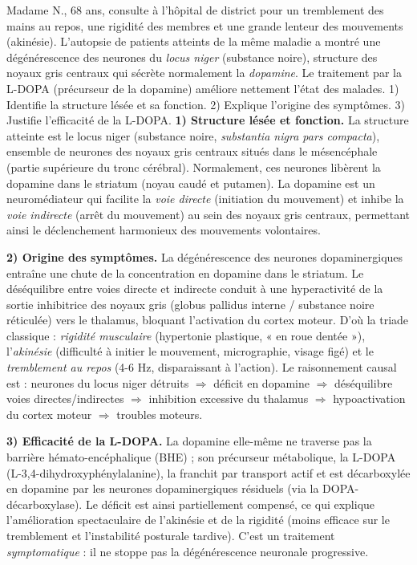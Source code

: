 \documentclass[11pt]{article}
\newcommand{\cle}[1]{{\popxbold\color{popdark}#1}}
\begin{document}
\begin{exoresolu}
Madame N., 68 ans, consulte à l'hôpital de district pour un tremblement des mains au repos, une rigidité des membres et une grande lenteur des mouvements (akinésie). L'autopsie de patients atteints de la même maladie a montré une dégénérescence des neurones du \emph{locus niger} (substance noire), structure des noyaux gris centraux qui sécrète normalement la \emph{dopamine}. Le traitement par la L-DOPA (précurseur de la dopamine) améliore nettement l'état des malades. 1) Identifie la structure lésée et sa fonction. 2) Explique l'origine des symptômes. 3) Justifie l'efficacité de la L-DOPA.
\tcblower
\textbf{1) Structure lésée et fonction.} La structure atteinte est le \cle{locus niger} (substance noire, \emph{substantia nigra pars compacta}), ensemble de neurones des noyaux gris centraux situés dans le mésencéphale (partie supérieure du tronc cérébral). Normalement, ces neurones libèrent la \cle{dopamine} dans le striatum (noyau caudé et putamen). La dopamine est un neuromédiateur qui facilite la \emph{voie directe} (initiation du mouvement) et inhibe la \emph{voie indirecte} (arrêt du mouvement) au sein des noyaux gris centraux, permettant ainsi le déclenchement harmonieux des mouvements volontaires.

\textbf{2) Origine des symptômes.} La dégénérescence des neurones dopaminergiques entraîne une chute de la concentration en dopamine dans le striatum. Le déséquilibre entre voies directe et indirecte conduit à une hyperactivité de la sortie inhibitrice des noyaux gris (globus pallidus interne / substance noire réticulée) vers le thalamus, bloquant l'activation du cortex moteur. D'où la triade classique : \emph{rigidité musculaire} (hypertonie plastique, « en roue dentée »), l'\emph{akinésie} (difficulté à initier le mouvement, micrographie, visage figé) et le \emph{tremblement au repos} (4-6 Hz, disparaissant à l'action). Le raisonnement causal est : neurones du locus niger détruits $\Rightarrow$ déficit en dopamine $\Rightarrow$ déséquilibre voies directes/indirectes $\Rightarrow$ inhibition excessive du thalamus $\Rightarrow$ hypoactivation du cortex moteur $\Rightarrow$ troubles moteurs.

\textbf{3) Efficacité de la L-DOPA.} La dopamine elle-même ne traverse pas la barrière hémato-encéphalique (BHE) ; son précurseur métabolique, la \cle{L-DOPA} (L-3,4-dihydroxyphénylalanine), la franchit par transport actif et est décarboxylée en dopamine par les neurones dopaminergiques résiduels (via la DOPA-décarboxylase). Le déficit est ainsi partiellement compensé, ce qui explique l'amélioration spectaculaire de l'akinésie et de la rigidité (moins efficace sur le tremblement et l'instabilité posturale tardive). C'est un traitement \emph{symptomatique} : il ne stoppe pas la dégénérescence neuronale progressive.


\end{exoresolu}
\end{document}
